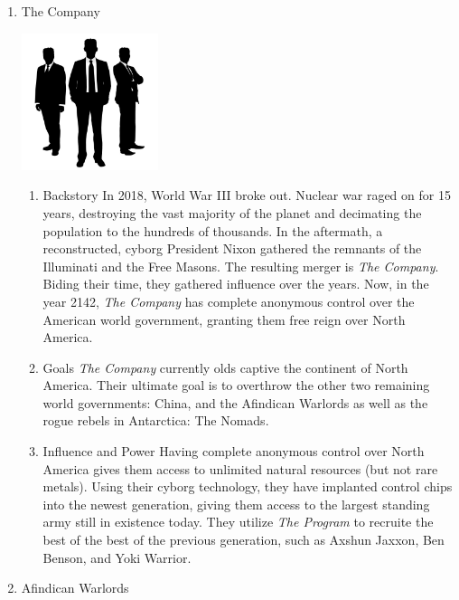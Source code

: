 \documentclass[12pt]{article}
\begin{document}
\begin{enumerate}
\item The Company
\label{sec:org6b5aa5f}

\begin{center}
\includegraphics[width=4cm]{./img/the-company.png}
\end{center}

\begin{enumerate}
\item Backstory
\label{sec:orga31bddc}
In 2018, World War III broke out. Nuclear war raged on for 15 years, destroying the vast majority of the planet and decimating the population to the hundreds of thousands. In the aftermath, a reconstructed, cyborg President Nixon gathered the remnants of the Illuminati and the Free Masons. The resulting merger is \emph{The Company}. Biding their time, they gathered influence over the years. Now, in the year 2142, \emph{The Company} has complete anonymous control over the American world government, granting them free reign over North America.

\item Goals
\label{sec:orgca64453}
\emph{The Company} currently olds captive the continent of North America. Their ultimate goal is to overthrow the other two remaining world governments: China, and the Afindican Warlords as well as the rogue rebels in Antarctica: The Nomads.

\item Influence and Power
\label{sec:org98e43cb}
Having complete anonymous control over North America gives them access to unlimited natural resources (but not rare metals). Using their cyborg technology, they have implanted control chips into the newest generation, giving them access to the largest standing army still in existence today. They utilize \emph{The Program} to recruite the best of the best of the previous generation, such as Axshun Jaxxon, Ben Benson, and Yoki Warrior.
\end{enumerate}

\item Afindican Warlords
\label{sec:orgedf3eb8}


\end{enumerate}
\end{document}
